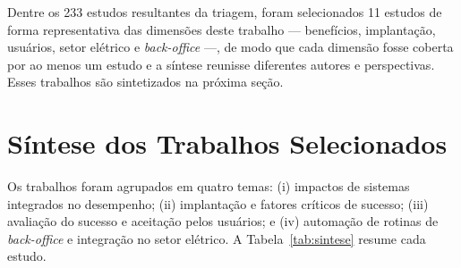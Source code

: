 Dentre os 233 estudos resultantes da triagem, foram selecionados 11 estudos de forma representativa das dimensões deste trabalho --- benefícios, implantação, usuários, setor elétrico e \textit{back-office} ---, de modo que cada dimensão fosse coberta por ao menos um estudo e a síntese reunisse diferentes autores e perspectivas. Esses trabalhos são sintetizados na próxima seção.

\section{Síntese dos Trabalhos Selecionados}
\label{sec:rev-sintese}

Os trabalhos foram agrupados em quatro temas: (i) impactos de sistemas integrados no desempenho; (ii) implantação e fatores críticos de sucesso; (iii) avaliação do sucesso e aceitação pelos usuários; e (iv) automação de rotinas de \textit{back-office} e integração no setor elétrico. A Tabela~\ref{tab:sintese} resume cada estudo.

